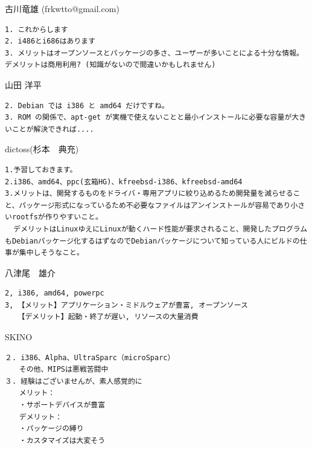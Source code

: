 \documentclass[mingoth,a4paper]{jsarticle}
\begin{document}
\begin{prework}{ 古川竜雄 (frkwtto@gmail.com) }

\begin{verbatim}
1. これからします
2. i486とi686はあります
3. メリットはオープンソースとパッケージの多さ、ユーザーが多いことによる十分な情報。デメリットは商用利用? (知識がないので間違いかもしれません)
\end{verbatim}

\end{prework}



\begin{prework}{ 山田 洋平 }

\begin{verbatim}
2. Debian では i386 と amd64 だけですね。
3. ROM の関係で、apt-get が実機で使えないことと最小インストールに必要な容量が大きいことが解決できれば....
\end{verbatim}

\end{prework}



\begin{prework}{ dictoss(杉本　典充) }

\begin{verbatim}
1.予習しておきます。
2.i386、amd64、ppc(玄箱HG)、kfreebsd-i386、kfreebsd-amd64
3.メリットは、開発するものをドライバ・専用アプリに絞り込めるため開発量を減らせること、パッケージ形式になっているため不必要なファイルはアンインストールが容易であり小さいrootfsが作りやすいこと。
  デメリットはLinuxゆえにLinuxが動くハード性能が要求されること、開発したプログラムもDebianパッケージ化するはずなのでDebianパッケージについて知っている人にビルドの仕事が集中しそうなこと。
\end{verbatim}

\end{prework}


\begin{prework}{ 八津尾　雄介 }

\begin{verbatim}
2, i386, amd64, powerpc
3, 【メリット】アプリケーション・ミドルウェアが豊富, オープンソース
   【デメリット】起動・終了が遅い, リソースの大量消費
\end{verbatim}
\end{prework}



\begin{prework}{ SKINO }

\begin{verbatim}
２. i386、Alpha、UltraSparc（microSparc）
　　その他、MIPSは悪戦苦闘中
３. 経験はございませんが、素人感覚的に
　　メリット：
　　・サポートデバイスが豊富
　　デメリット：
　　・パッケージの縛り
　　・カスタマイズは大変そう
\end{verbatim}

\end{prework}
\end{document}

